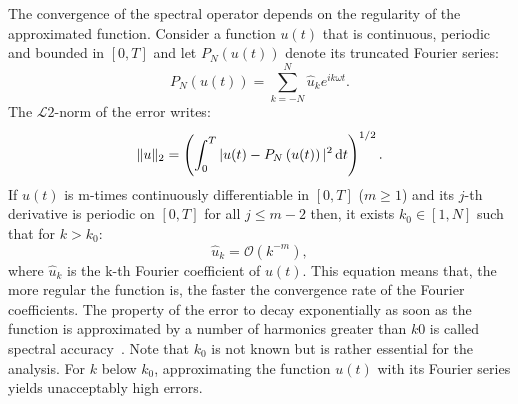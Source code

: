 
The convergence of the spectral operator depends on
the regularity of the approximated function. Consider a function
$u(t)$ that is continuous, periodic and bounded in $[0,T]$
and let $P_N \left(u(t)\right)$ denote its truncated Fourier series:
\begin{equation}
    P_N \left(u(t)\right) = \sum_{k=-N}^{N} \widehat{u}_k e^{i k\omega t}.
\end{equation}
The $\mathcal{L}2$-norm of the error writes:
\begin{equation}
   \| u \|_2 = \left(\int_0^T |u(t) - P_N \left(u(t)\right)|^2 \mathop{}\!\mathrm{d} t \right)^{1/2}.
\end{equation}
If $u(t)$ is m-times continuously differentiable in $[0,T]$ ($m \geq 1$) 
and its $j$-th derivative is periodic on $[0,T]$ for all $j \leq m - 2$
then, it exists  $k_0 \in [1, N]$ such that for $k > k_0$:
\begin{equation}
    \widehat{u}_k = \mathcal{O} (k^{-m}),
\end{equation}
where $\widehat{u}_k$ is the k-th Fourier coefficient of $u(t)$.
This equation means that, the more regular the function is,
the faster the convergence rate of the Fourier
coefficients.
The property of the error to decay exponentially as soon as 
the function is approximated by a number of harmonics greater than $k0$ 
is called spectral accuracy~\cite{Canuto2006}. Note that
$k_0$ is not known but is rather essential for the analysis.
For $k$ below $k_0$, approximating the function $u(t)$ with its Fourier
series yields unacceptably high errors.
